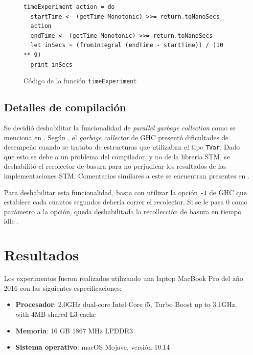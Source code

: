 \begin{figure}[t]
    \centering
\begin{verbatim}
timeExperiment action = do
  startTime <- (getTime Monotonic) >>= return.toNanoSecs
  action
  endTime <- (getTime Monotonic) >>= return.toNanoSecs
  let inSecs = (fromIntegral (endTime - startTime)) / (10 ** 9)
  print inSecs
\end{verbatim}
\caption{Código de la función \texttt{timeExperiment}}
    \label{fig:timeExperiment}
\end{figure}

\subsection{Detalles de compilación}
Se decidió deshabilitar la funcionalidad de \emph{parallel garbage collection} como se menciona en \cite{linked-list}.
Según \cite{linked-list}, el \emph{garbage collector} de GHC presentó dificultades de desempeño cuando se trataba de estructuras que utilizaban el tipo \texttt{TVar}.
Dado que esto se debe a un problema del compilador, y no de la librería STM, se deshabilitó el recolector de basura para no perjudicar los resultados de las implementaciones STM.
Comentarios similares a este se encuentran presentes en \cite{abq}.

Para deshabilitar esta funcionalidad, basta con utilizar la opción \texttt{-I} de GHC que establece cada cuantos segundos debería correr el recolector. Si se le pasa 0 como parámetro a la opción, queda deshabilitada la recollección de basura en tiempo idle \cite{garbagecollection}.

\section{Resultados}\label{sec:results}

Los experimentos fueron realizados utilizando una laptop MacBook Pro del año 2016 con las siguientes especificaciones:

\begin{itemize}
    \item \textbf{Procesador}: 2.0GHz dual-core Intel Core i5, Turbo Boost up to 3.1GHz, with 4MB shared L3 cache
    \item \textbf{Memoria}: 16 GB 1867 MHz LPDDR3
    \item \textbf{Sistema operativo}: macOS Mojave, versión 10.14
\end{itemize}

